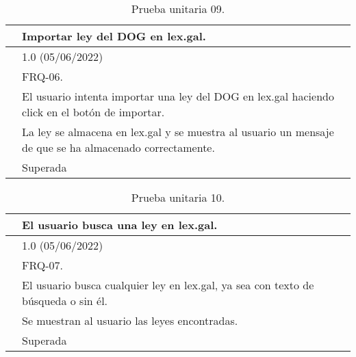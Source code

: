 \begin{table}[H]
\begin{center}
\begin{tabular}{|p{3cm}|p{10cm}|} \hline
\centering {\bf PU-09} & Importar ley del DOG en lex.gal.  \\ \hline\hline
\centering {\bf Versión} & 1.0 (05/06/2022) \\ \hline
\centering {\bf Dependencias} & FRQ-06. \\ \hline
\centering {\bf Descripción} &  El usuario intenta importar una ley del DOG en lex.gal haciendo click en el botón de importar. \\ \hline
\centering {\bf Criterio de aceptación} & La ley se almacena en lex.gal y se muestra al usuario un mensaje de que se ha almacenado correctamente. \\ \hline
\centering {\bf Estado} & Superada \\ \hline
\end{tabular}
\caption{Prueba unitaria 09.}
\label{enlacePU9}
\end{center}
\end{table}

\begin{table}[H]
\begin{center}
\begin{tabular}{|p{3cm}|p{10cm}|} \hline
\centering {\bf PU-10} & El usuario busca una ley en lex.gal.  \\ \hline\hline
\centering {\bf Versión} & 1.0 (05/06/2022) \\ \hline
\centering {\bf Dependencias} & FRQ-07. \\ \hline
\centering {\bf Descripción} &  El usuario busca cualquier ley en lex.gal, ya sea con texto de búsqueda o sin él. \\ \hline
\centering {\bf Criterio de aceptación} & Se muestran al usuario las leyes encontradas. \\ \hline
\centering {\bf Estado} & Superada \\ \hline
\end{tabular}
\caption{Prueba unitaria 10.}
\label{enlacePU10}
\end{center}
\end{table}

